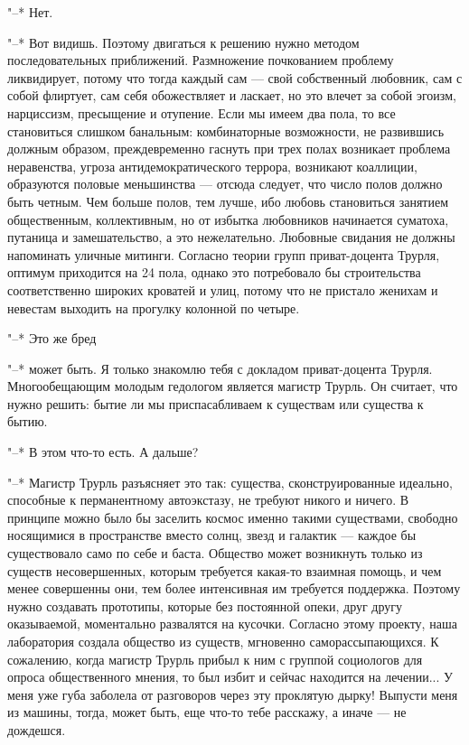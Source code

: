 "--* Нет.

"--* Вот видишь. Поэтому двигаться к решению нужно методом
последовательных приближений. Размножение почкованием
проблему ликвидирует, потому что тогда каждый сам --- свой
собственный любовник, сам с собой флиртует, сам себя
обожествляет и ласкает, но это влечет за собой эгоизм,
нарциссизм, пресыщение и отупение. Если мы имеем два пола,
то все становиться слишком банальным: комбинаторные
возможности, не развившись должным образом, преждевременно
гаснуть при трех полах возникает проблема неравенства,
угроза антидемократического террора, возникают коаллиции,
образуются половые меньшинства --- отсюда следует, что число
полов должно быть четным. Чем больше полов, тем лучше, ибо
любовь становиться занятием общественным, коллективным, но
от избытка любовников начинается суматоха, путаница и
замешательство, а это нежелательно. Любовные свидания не
должны напоминать уличные митинги. Согласно теории групп
приват-доцента Трурля, оптимум приходится на 24 пола, однако
это потребовало бы строительства соответственно широких
кроватей и улиц, потому что не пристало женихам и невестам
выходить на прогулку колонной по четыре.

"--* Это же бред

"--* может быть. Я только знакомлю тебя с докладом
приват-доцента Трурля. Многообещающим молодым гедологом
является магистр Трурль. Он считает, что нужно решить: бытие
ли мы приспасабливаем к существам или существа к бытию.

"--* В этом что-то есть. А дальше?

"--* Магистр Трурль разъясняет это так: существа,
сконструированные идеально, способные к перманентному
автоэкстазу, не требуют никого и ничего. В принципе можно
было бы заселить космос именно такими существами, свободно
носящимися в пространстве вместо солнц, звезд и галактик --- каждое
бы существовало само по себе и баста. Общество может
возникнуть только из существ несовершенных, которым
требуется какая-то взаимная помощь, и чем менее совершенны
они, тем более интенсивная им требуется поддержка. Поэтому
нужно создавать прототипы, которые без постоянной опеки,
друг другу оказываемой, моментально развалятся на кусочки.
Согласно этому проекту, наша лаборатория создала общество из
существ, мгновенно саморассыпающихся. К сожалению, когда
магистр Трурль прибыл к ним с группой социологов для опроса
общественного мнения, то был избит и сейчас находится на
лечении... У меня уже губа заболела от разговоров через эту
проклятую дырку! Выпусти меня из машины, тогда, может быть,
еще что-то тебе расскажу, а иначе --- не дождешся.

